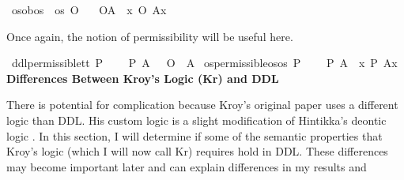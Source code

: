 \begin{isabellebody}
\isamarkupfalse%
\ os{\isacharunderscore}ob{\isacharcolon}{\isacharcolon}{\isachardoublequoteopen}os\ {\isasymRightarrow}\ os{\isachardoublequoteclose}\ {\isacharparenleft}{\isachardoublequoteopen}\isactrlemph O{\isacharbraceleft}{\isacharunderscore}{\isacharbraceright}{\isachardoublequoteclose}{\isacharparenright}\isanewline
\ \ \ {\isachardoublequoteopen}\isactrlemph O{\isacharbraceleft}A{\isacharbraceright}\ {\isasymequiv}\ {\isasymlambda}x{\isachardot}\ {\isacharparenleft}O\ {\isacharbraceleft}A{\isacharparenleft}x{\isacharparenright}{\isacharbraceright}{\isacharparenright}{\isachardoublequoteclose}%
\begin{isamarkuptext}%
Once again, the notion of permissibility will be useful here.%
\end{isamarkuptext}\isamarkuptrue%
\isamarkupfalse%
\ ddl{\isacharunderscore}permissible{\isacharcolon}{\isacharcolon}{\isachardoublequoteopen}t{\isasymRightarrow}t{\isachardoublequoteclose}\ {\isacharparenleft}{\isachardoublequoteopen}P\ {\isacharbraceleft}{\isacharunderscore}{\isacharbraceright}{\isachardoublequoteclose}{\isacharparenright}\isanewline
\ \ \ {\isachardoublequoteopen}P\ {\isacharbraceleft}A{\isacharbraceright}\ {\isasymequiv}\ \isactrlbold {\isasymnot}\ {\isacharparenleft}O\ {\isacharbraceleft}\isactrlbold {\isasymnot}\ A{\isacharbraceright}{\isacharparenright}{\isachardoublequoteclose}\isanewline
{}\isamarkupfalse%
\ os{\isacharunderscore}permissible{\isacharcolon}{\isacharcolon}{\isachardoublequoteopen}os{\isasymRightarrow}os{\isachardoublequoteclose}\ {\isacharparenleft}{\isachardoublequoteopen}\isactrlemph P\ {\isacharbraceleft}{\isacharunderscore}{\isacharbraceright}{\isachardoublequoteclose}{\isacharparenright}\isanewline
\ \ \ {\isachardoublequoteopen}\isactrlemph P\ {\isacharbraceleft}A{\isacharbraceright}\ {\isasymequiv}\ {\isasymlambda}x{\isachardot}\ P\ {\isacharbraceleft}A{\isacharparenleft}x{\isacharparenright}{\isacharbraceright}{\isachardoublequoteclose}%
\textbf{Differences Between Kroy's Logic (Kr) and DDL}
%
\begin{isamarkuptext}%
There is potential for complication because Kroy's original paper uses a different logic than DDL. 
His custom logic is a slight modification of Hintikka's deontic logic \cite{hintikka}. In this section, 
I will determine if some of the semantic properties that Kroy's logic (which I will now call Kr) requires 
hold in DDL. These differences may become important later and can explain differences in my results and 

\end{isamarkuptext}
\end{isabellebody}
